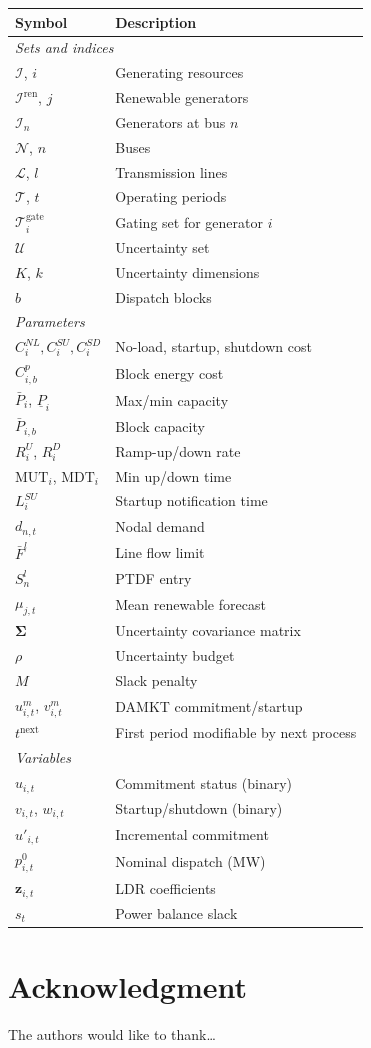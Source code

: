 \documentclass[journal]{IEEEtran}
\begin{document}
\begin{table}[h]
\renewcommand{\arraystretch}{1.15}
\centering
\begin{tabular}{ll}
\hline
\textbf{Symbol} & \textbf{Description} \\
\hline
\multicolumn{2}{l}{\emph{Sets and indices}} \\
$\mathcal{I}$, $i$ & Generating resources \\
$\mathcal{I}^{\text{ren}}$, $j$ & Renewable generators \\
$\mathcal{I}_n$ & Generators at bus $n$ \\
$\mathcal{N}$, $n$ & Buses \\
$\mathcal{L}$, $l$ & Transmission lines \\
$\mathcal{T}$, $t$ & Operating periods \\
$\mathcal{T}_i^{\text{gate}}$ & Gating set for generator $i$ \\
$\mathcal{U}$ & Uncertainty set \\
$K$, $k$ & Uncertainty dimensions \\
$b$ & Dispatch blocks \\
\hline
\multicolumn{2}{l}{\emph{Parameters}} \\
$C_i^{NL},C_i^{SU},C_i^{SD}$ & No-load, startup, shutdown cost \\
$C_{i,b}^p$ & Block energy cost \\
$\bar{P}_i$, $\underline{P}_i$ & Max/min capacity \\
$\bar{P}_{i,b}$ & Block capacity \\
$R_i^U$, $R_i^D$ & Ramp-up/down rate \\
$\text{MUT}_i$, $\text{MDT}_i$ & Min up/down time \\
$L_i^{SU}$ & Startup notification time \\
$d_{n,t}$ & Nodal demand \\
$\bar{F}^l$ & Line flow limit \\
$S_n^l$ & PTDF entry \\
$\mu_{j,t}$ & Mean renewable forecast \\
$\boldsymbol{\Sigma}$ & Uncertainty covariance matrix \\
$\rho$ & Uncertainty budget \\
$M$ & Slack penalty \\
$u_{i,t}^m$, $v_{i,t}^m$ & DAMKT commitment/startup \\
$t^{\text{next}}$ & First period modifiable by next process \\
\hline
\multicolumn{2}{l}{\emph{Variables}} \\
$u_{i,t}$ & Commitment status (binary) \\
$v_{i,t}$, $w_{i,t}$ & Startup/shutdown (binary) \\
$u'_{i,t}$ & Incremental commitment \\
$p_{i,t}^0$ & Nominal dispatch (MW) \\
$\mathbf{z}_{i,t}$ & LDR coefficients \\
$s_t$ & Power balance slack \\
\hline
\end{tabular}
\end{table}

\section*{Acknowledgment}
The authors would like to thank\ldots



\end{document}
